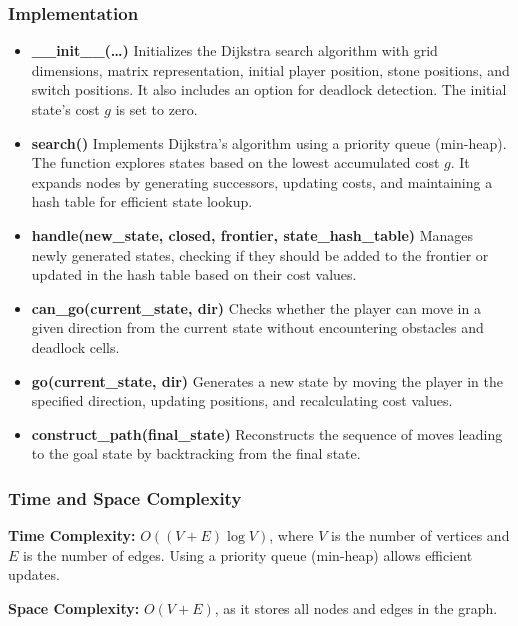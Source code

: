 \subsubsection{Implementation}
\begin{itemize}
	\item \textbf{\_\_init\_\_(\ldots)}
	      Initializes the Dijkstra search algorithm with grid dimensions, matrix representation, initial player position, stone positions, and switch positions. It also includes an option for deadlock detection. The initial state's cost \( g \) is set to zero.

	\item \textbf{search()}
	      Implements Dijkstra's algorithm using a priority queue (min-heap). The function explores states based on the lowest accumulated cost \( g \). It expands nodes by generating successors, updating costs, and maintaining a hash table for efficient state lookup.

	\item \textbf{handle(new\_state, closed, frontier, state\_hash\_table)}
	      Manages newly generated states, checking if they should be added to the frontier or updated in the hash table based on their cost values.

	\item \textbf{can\_go(current\_state, dir)}
	      Checks whether the player can move in a given direction from the current state without encountering obstacles and deadlock cells.

	\item \textbf{go(current\_state, dir)}
	      Generates a new state by moving the player in the specified direction, updating positions, and recalculating cost values.

	\item \textbf{construct\_path(final\_state)}
	      Reconstructs the sequence of moves leading to the goal state by backtracking from the final state.
\end{itemize}

\subsubsection{Time and Space Complexity}
\textbf{Time Complexity:} \( O((V + E) \log V) \), where \( V \) is the number of vertices and \( E \) is the number of edges. Using a priority queue (min-heap) allows efficient updates.

\textbf{Space Complexity:} \( O(V + E) \), as it stores all nodes and edges in the graph.
